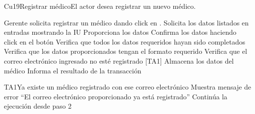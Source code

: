 \begin{UseCase}{Cu19}{Registrar médico}{El actor desea registrar un nuevo médico.}
	
\end{UseCase}

\begin{UCtrayectoria}{Gerente}
		\UCpaso[\UCactor] solicita registrar un médico dando click en .
		\UCpaso Solicita los datos listados en entradas mostrando la IU
		\UCpaso [\UCactor] Proporciona los datos
		\UCpaso [\UCactor] Confirma los datos haciendo click en el botón 
		\UCpaso Verifica que todos los datos requeridos hayan sido completados
		\UCpaso Verifica que los datos proporcionados tengan el formato requerido
		\UCpaso Verifica que el correo electrónico ingresado no esté registrado [TA1]
		\UCpaso Almacena los datos del médico 
		\UCpaso Informa el resultado de la transacción
\end{UCtrayectoria}

\begin{UCtrayectoriaA}{TA1}{Ya existe un médico registrado con ese correo electrónico}
	\UCpaso Muestra mensaje de error ``El correo electrónico proporcionado ya está registrado''
	\UCpaso Continúa la ejecución desde paso 2
	
\end{UCtrayectoriaA}

